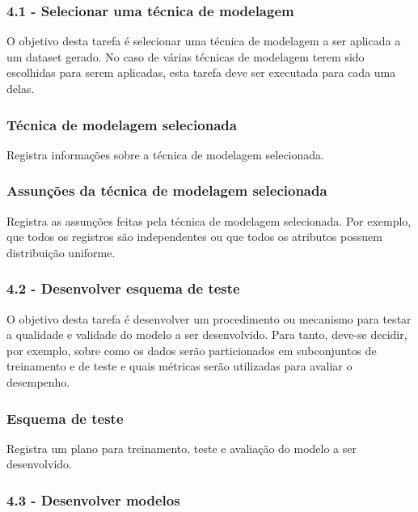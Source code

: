 
\subsubsection*{\textbf{4.1 - Selecionar uma técnica de modelagem}}

O objetivo desta tarefa é selecionar uma técnica de modelagem a ser aplicada a um dataset gerado. No caso de várias técnicas de modelagem terem sido escolhidas para serem aplicadas, esta tarefa deve ser executada para cada uma delas.

\subsubsection*{Técnica de modelagem selecionada}

Registra informações sobre a técnica de modelagem selecionada.

\subsubsection*{Assunções da técnica de modelagem selecionada}

Registra as assunções feitas pela técnica de modelagem selecionada. Por exemplo, que todos os registros são independentes ou que todos os atributos possuem distribuição uniforme.

\subsubsection*{\textbf{4.2 - Desenvolver esquema de teste}}

O objetivo desta tarefa é desenvolver um procedimento ou mecanismo para testar a qualidade e validade do modelo a ser desenvolvido. Para tanto, deve-se decidir, por exemplo, sobre como os dados serão particionados em subconjuntos de treinamento e de teste e quais métricas serão utilizadas para avaliar o desempenho.

\subsubsection*{Esquema de teste}

Registra um plano para treinamento, teste e avaliação do modelo a ser desenvolvido.

\subsubsection*{\textbf{4.3 - Desenvolver modelos}}


